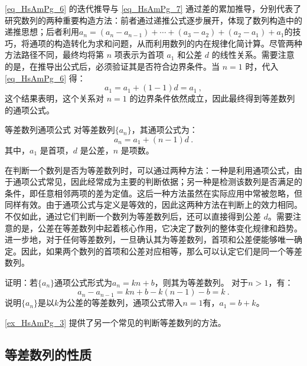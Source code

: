 \autoref{eq_HsAmPg_6} 的迭代推导与 \autoref{eq_HsAmPg_7} 通过差的累加推导，分别代表了研究数列的两种重要构造方法：前者通过递推公式逐步展开，体现了数列构造中的递推思想；后者利用$a_n=(a_n-a_{n-1})+ \cdots+(a_3 - a_2) +(a_2 - a_1)  + a_1$的技巧，将通项的构造转化为求和问题，从而利用数列的内在规律化简计算。尽管两种方法路径不同，最终均将第 $n$ 项表示为首项 $a_1$ 和公差 $d$ 的线性关系。需要注意的是，在推导出公式后，必须验证其是否符合边界条件。当  $n = 1$  时，代入\autoref{eq_HsAmPg_6} 得：
\begin{equation}
a_1 = a_1 + (1 - 1)d = a_1~,
\end{equation}
这个结果表明，这个关系对 $n = 1$ 的边界条件依然成立，因此最终得到等差数列的通项公式。
\begin{corollary}{等差数列通项公式}
对等差数列$\{a_n\}$，其通项公式为：
\begin{equation}\label{eq_HsAmPg_5}
a_n = a_1 + (n - 1)d~.
\end{equation}
其中，$a_1$ 是首项，$d$ 是公差，$n$ 是项数。
\end{corollary}

在判断一个数列是否为等差数列时，可以通过两种方法：一种是利用通项公式，由于通项公式常见，因此经常成为主要的判断依据；另一种是检测该数列是否满足的条件，即任意相邻两项的差为定值。这后一种方法虽然在实际应用中常被忽略，但同样有效。由于通项公式与定义是等效的，因此这两种方法在判断上的效力相同。不仅如此，通过它们判断一个数列为等差数列后，还可以直接得到公差 $d$。需要注意的是，公差在等差数列中起着核心作用，它决定了数列的整体变化规律和趋势。进一步地，对于任何等差数列，一旦确认其为等差数列，首项和公差便能够唯一确定。因此，如果两个数列的首项和公差对应相等，那么可以认定它们是同一个等差数列。

\begin{example}{证明：若$\{a_n\}$通项公式形式为$a_n=kn+b$，则其为等差数列。}\label{ex_HsAmPg_3}
对于$n>1$，有：
\begin{equation}
a_n-a_{n-1}=kn+b-k(n-1)-b=k~.
\end{equation}
说明$\{a_n\}$是以$k$为公差的等差数列，通项公式带入$n=1$有，$a_1=b+k$。
\end{example}

\autoref{ex_HsAmPg_3} 提供了另一个常见的判断等差数列的方法。

\subsection{等差数列的性质}

